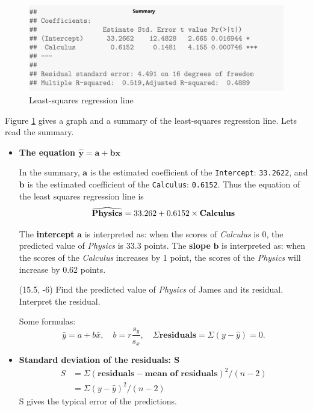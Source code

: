 \documentclass[a4paper, 12pt,twoside]{book}
\newcommand\reallywidehat[1]{%
\savestack{\tmpbox}{\stretchto{%
  \scaleto{%
    \scalerel*[\widthof{\ensuremath{#1}}]{\kern-.6pt\bigwedge\kern-.6pt}%
    {\rule[-\textheight/2]{1ex}{\textheight}}%
  }{\textheight}%
}{0.5ex}}%
\stackon[1pt]{#1}{\tmpbox}%
}
\begin{document}
\begin{itemize}
\begin{figure}[H]
\begin{center}
 \includegraphics[scale=0.45]{SummaryLeastSquareRL.png}
 \end{center}
 \caption{Least-squares regression line}
 \label{LeastSquaresRegressionLine}
 \end{figure}
Figure \ref{LeastSquaresRegressionLine} gives a graph and a summary of the least-squares regression line. Lets read the summary.\vspace{0.3cm}

\begin{itemize}[leftmargin = 0cm]
 \item \textbf{The equation $\mathbf{\hat{y} = a + bx}$} \vspace{0.3cm}

 In the summary, $\mathbf{a}$ is the estimated coefficient of the \texttt{Intercept}: \texttt{33.2622}, and $\mathbf{b}$ is the estimated coefficient of the \texttt{Calculus}: \texttt{0.6152}. Thus the equation of the least squares regression line is $$\reallywidehat{\textbf{Physics}} = 33.262 + 0.6152 \times \textbf{Calculus}$$
 
 \colorbox{babypink}{\parbox{\textwidth}{
 The \textbf{intercept} $\mathbf{a}$ is interpreted as: when the scores of \textit{Calculus} is 0, the predicted value of \textit{Physics} is $33.3$ points. The \textbf{slope} $\mathbf{b}$ is interpreted as: when the scores of the \textit{Calculus} increases by 1 point, the scores of the \textit{Physics} will increase by 0.62 points.
 }}


\begin{textblock}{3.2}(15.5, -6)
Find the predicted value of \textit{Physics} of James and its residual. Interpret the residual.
\end{textblock}

\colorbox{babypink}{\parbox{0.9\textwidth}{
Some formulas:
$$\bar{y} = a + b\bar{x}, \quad b = r\frac{s_y}{s_x}, \quad \Sigma\textbf{residuals} = \Sigma(y-\hat{y})=0.$$
}}\vspace{0.3cm}

\item \textbf{Standard deviation of the residuals: $\mathbf{S}$}
\begin{equation*}
\begin{split}
S &= \Sigma(\textbf{residuals} - \textbf{mean of residuals})^2/(n-2)\\
  &= \Sigma(y-\hat{y})^2/(n-2)
\end{split}
\end{equation*}
\colorbox{babypink}{S gives the typical error of the predictions.}\vspace{0.6cm}


\end{itemize}
\end{itemize}
\end{document}
